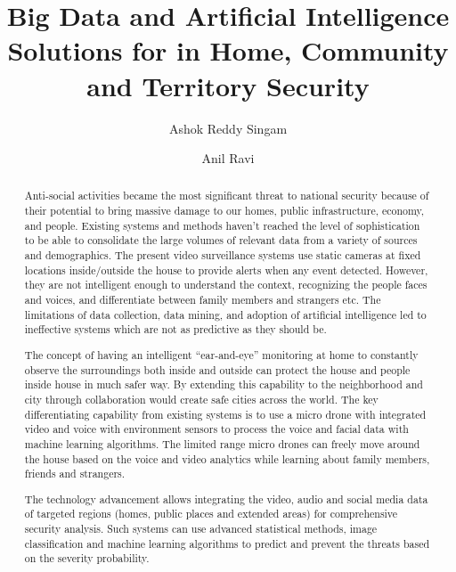 \documentclass[sigconf]{acmart}
\begin{document}
\title{Big Data and Artificial Intelligence Solutions for in Home, Community and Territory Security}


\author{Ashok Reddy Singam}

\author{Anil Ravi}

\begin{abstract}
Anti-social activities became the most significant threat to national security because of their potential to bring massive damage to our homes, public infrastructure, economy, and people. Existing systems and methods haven't reached the level of sophistication to be able to consolidate the large volumes of relevant data from a variety of sources and demographics. The present video surveillance systems use static cameras at fixed locations inside/outside the house to provide alerts when any event detected. However, they are not intelligent enough to understand the context, recognizing the people faces and voices, and differentiate between family members and strangers etc. The limitations of data collection, data mining, and adoption of artificial intelligence led to ineffective systems which are not as predictive as they should be.

The concept of having an intelligent ``ear-and-eye'' monitoring at home to constantly observe the surroundings both inside and outside can protect the house and people inside house in much safer way. By extending this capability to the neighborhood and city through collaboration would create safe cities across the world. 
The key differentiating capability from existing systems is to use a micro drone with integrated video and voice with environment sensors to process the voice and facial data with machine learning algorithms. The limited range micro drones can freely move around the house based on the voice and video analytics while learning about family members, friends and strangers. 

The technology advancement allows integrating the video, audio and social media data of targeted regions (homes, public places and extended areas) for comprehensive security analysis. Such systems can use advanced statistical methods, image classification and machine learning algorithms to predict and prevent the threats based on the severity probability.

\end{abstract}
\end{document}

